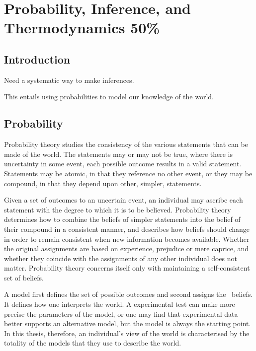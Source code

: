 
\chapter{Probability, Inference, and Thermodynamics 50\%}{\label{sec:variationalMethods}

\section{Introduction}

Need a systematic way to make inferences.

This entails using probabilities to model our knowledge of the world.



\section{Probability}



Probability theory studies the consistency of the various statements that can be made of the world.
The statements may or may not be true,
where there is uncertainty in some event, 
each possible outcome results in a valid statement.
Statements may be atomic, in that they reference no other event,
or they may be compound, in that they depend upon other, simpler, statements.

Given a set of outcomes to an uncertain event, 
an individual may ascribe each statement with the degree to which it is to be believed.
Probability theory determines how to combine the beliefs of simpler statements
into the belief of their compound in a consistent manner,
and describes how beliefs should change in order to remain consistent when new information becomes available.
Whether the original assignments are based on experience, prejudice or mere caprice,
and whether they coincide with the assignments of any other individual does not matter.
Probability theory concerns itself only with maintaining a self-consistent set of beliefs.


A model first defines the set of possible outcomes and second assigns the \apriori\ beliefs.
It defines  how one interprets the world.
A experimental test can make more precise the parameters of the model,
or one may find that experimental data better supports an alternative model,
but the model is always the starting point.
In this thesis, therefore, an individual's view of the world is characterised by the totality of the models that they use to describe the world.

}
